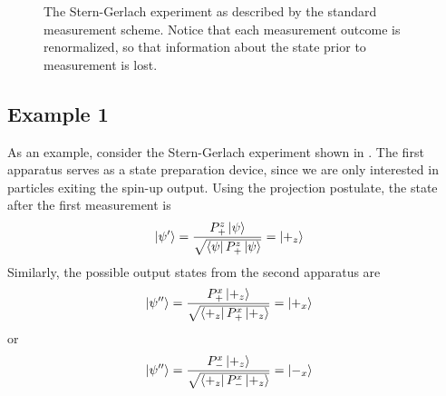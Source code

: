 \begin{figure}
\centering\CaptionFontSize
{}
\caption[Insert an abbreviated caption here to show in the List of Figures]
{The Stern-Gerlach experiment as described by the standard measurement scheme. Notice that each measurement outcome is renormalized, so that information about the state prior to measurement is lost.}
\label{Figure:Measurement:Renormalizing}
\end{figure}

\subsection{Example 1}

As an example, consider the Stern-Gerlach experiment shown in . The first apparatus serves as a state preparation device, since we are only interested in particles exiting the spin-up output. Using the projection postulate, the state after the first measurement is
\begin{align}
    \ket{\psi^\prime} &= \frac{{P^z_+}\ket{\psi}}{\sqrt{\bra{\psi}P^z_+\ket{\psi}}} = \ket{+_z}
\end{align}
Similarly, the possible output states from the second apparatus are
\begin{align}
  \ket{\psi^{\prime\prime}} &= \frac{P^x_+\ket{+_z}}{\sqrt{\bra{+_z}P^x_+\ket{+_z}}} = \ket{+_x}
\end{align}
or
\begin{align}
  \ket{\psi^{\prime\prime}} &= \frac{P^x_-\ket{+_z}}{\sqrt{\bra{+_z}P^x_-\ket{+_z}}} = \ket{-_x}
\end{align}

